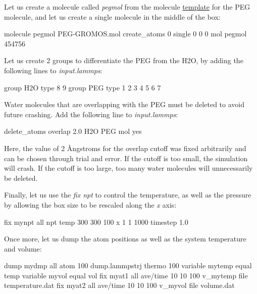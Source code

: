 \noindent Let us create a molecule called \textit{pegmol} from
the molecule \href{https://lammpstutorials.github.io/lammpstutorials-inputs/level2/polymer-in-water/mergePEGH2O/PEG-GROMOS.mol}{template}
for the PEG molecule, and let us create a single molecule in the middle of
the box:

\begin{lcverbatim}
molecule pegmol PEG-GROMOS.mol
create_atoms 0 single 0 0 0 mol pegmol 454756
\end{lcverbatim}

\noindent Let us create 2 groups to differentiate the PEG from the H2O,
by adding the following lines to \textit{input.lammps}:

\begin{lcverbatim}
group H2O type 8 9
group PEG type 1 2 3 4 5 6 7
\end{lcverbatim}

\noindent Water molecules that are overlapping with the PEG must be deleted to avoid
future crashing. Add the following line to \textit{input.lammps}:

\begin{lcverbatim}
delete_atoms overlap 2.0 H2O PEG mol yes
\end{lcverbatim}

\noindent Here, the value of 2 Ångstroms for the overlap cutoff was fixed arbitrarily
and can be chosen through trial and error. If the cutoff is too small, the 
simulation will crash. If the cutoff is too large, too many water molecules
will unnecessarily be deleted.

\vspace{0.25cm} \noindent Finally, let us use the \textit{fix npt} to control the temperature, as well as
the pressure by allowing the box size to be rescaled along the \textit{x} axis:

\begin{lcverbatim}
fix mynpt all npt temp 300 300 100 x 1 1 1000
timestep 1.0
\end{lcverbatim}

\noindent Once more, let us dump the atom positions as well as the system temperature
and volume:

\begin{lcverbatim}
dump mydmp all atom 100 dump.lammpstrj
thermo 100
variable mytemp equal temp
variable myvol equal vol
fix myat1 all ave/time 10 10 100 v_mytemp file temperature.dat
fix myat2 all ave/time 10 10 100 v_myvol file volume.dat
\end{lcverbatim}

